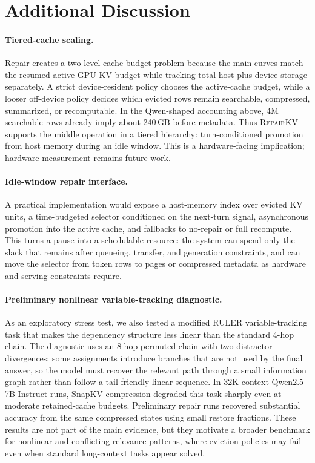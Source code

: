 \documentclass{article}
\newcommand{\repairkv}{\textsc{RepairKV}}
\begin{document}
\section{Additional Discussion}
\label{app:additional-discussion}

\paragraph{Tiered-cache scaling.}
Repair creates a two-level cache-budget problem because the main curves match
the resumed active GPU KV budget while tracking total host-plus-device
storage separately.
A strict device-resident policy chooses the active-cache budget, while a
looser off-device policy decides which evicted rows remain searchable,
compressed, summarized, or recomputable.
In the Qwen-shaped accounting
above, 4M searchable rows already imply about 240\,GB before metadata.
Thus \repairkv{} supports the middle operation in a tiered hierarchy:
turn-conditioned promotion from host memory during an idle window.
This is a hardware-facing implication; hardware measurement remains
future work.

\paragraph{Idle-window repair interface.}
A practical implementation would expose a host-memory index over evicted KV
units, a time-budgeted selector conditioned on the next-turn signal,
asynchronous promotion into the active cache, and fallbacks to no-repair or
full recompute.
This turns a pause into a schedulable resource: the system can spend only
the slack that remains after queueing, transfer, and generation
constraints, and can move the selector from token rows to pages or
compressed metadata as hardware and serving constraints require.

\paragraph{Preliminary nonlinear variable-tracking diagnostic.}
\label{app:vt8hop-div2}
As an exploratory stress test, we also tested a modified RULER
variable-tracking task that makes the dependency structure less linear than the
standard 4-hop chain. The diagnostic uses an 8-hop permuted chain with two
distractor divergences: some assignments introduce branches that are not used by
the final answer, so the model must recover the relevant path through a small
information graph rather than follow a tail-friendly linear sequence. In
32K-context Qwen2.5-7B-Instruct runs, SnapKV compression degraded this task
sharply even at moderate retained-cache budgets. Preliminary repair runs
recovered substantial accuracy from the same compressed states using small
restore fractions. These results are not part of the main evidence, but they
motivate a broader benchmark for nonlinear and conflicting relevance patterns,
where eviction policies may fail even when standard long-context tasks appear
solved.
\end{document}
